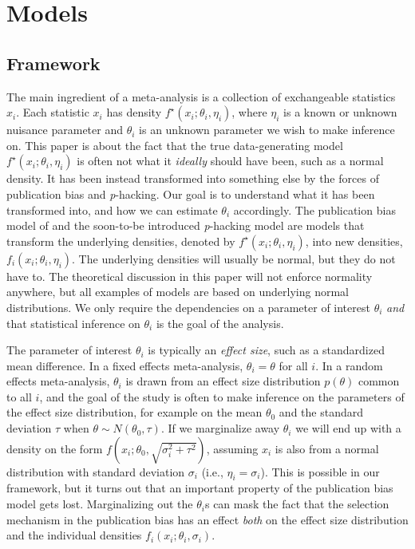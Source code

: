 \documentclass[preprint, authoryear]{elsarticle}
\theoremstyle{plain}
\theoremstyle{definition}
\begin{document}
\section{Models}\label{sect:models}

\subsection{Framework}
The main ingredient of a meta-analysis is a collection of exchangeable statistics $x_{i}$. Each statistic $x_{i}$ has density $f^{\star}\left(x_{i};\theta_{i},\eta_{i}\right)$, where $\eta_i$ is a known or unknown nuisance parameter and $\theta_{i}$ is an unknown parameter we wish to make inference on. This paper is about the fact that the true data-generating model $f^{\star}\left(x_{i};\theta_{i},\eta_{i}\right)$ is often not what it \emph{ideally} should have been, such as a normal density. It has been instead transformed into something else by the forces of publication bias and \emph{p}-hacking. Our goal is to understand what it has been transformed into, and how we can estimate $\theta_{i}$ accordingly. The publication bias model of \citet{hedges1992modeling,iyengar1988selection} and the soon-to-be introduced \emph{p}-hacking model are models that transform the underlying densities, denoted by $f^{\star}\left(x_{i};\theta_{i},\eta_{i}\right)$, into new densities, $f_{i}\left(x_{i};\theta_{i},\eta_{i}\right)$. The underlying densities will usually be normal, but they do not have to. The theoretical discussion in this paper will not enforce normality anywhere, but all examples of models are based on underlying normal distributions. We only require the dependencies on a parameter of interest $\theta_{i}$ \emph{and} that statistical inference on $\theta_{i}$ is the goal of the analysis.

The parameter of interest $\theta_{i}$ is typically an \emph{effect size}, such as a standardized mean difference. In a fixed effects meta-analysis, $\theta_{i}=\theta$ for all $i$. In a random effects meta-analysis, $\theta_{i}$ is drawn from an effect size distribution $p\left(\theta\right)$ common to all $i$, and the goal of the study is often to make inference on the parameters of the effect size distribution, for example on the mean $\theta_{0}$ and the standard deviation $\tau$ when $\theta \sim N\left(\theta_{0},\tau\right)$. If we marginalize away $\theta_{i}$ we will end up with a density on the form $f\left(x_{i}; \theta_{0},\sqrt{\sigma_{i}^{2}+\tau^{2}}\right)$, assuming $x_{i}$ is also from a normal distribution with standard deviation $\sigma_{i}$ (i.e., $\eta_i = \sigma_i$). This is possible in our framework, but it turns out that an important property of the publication bias model gets lost. Marginalizing out the $\theta_{i}$s can mask the fact that the selection mechanism in the publication bias has an effect \emph{both} on the effect size distribution and the individual densities $f_{i}\left(x_{i};\theta_i, \sigma_i\right)$.
\end{document}
